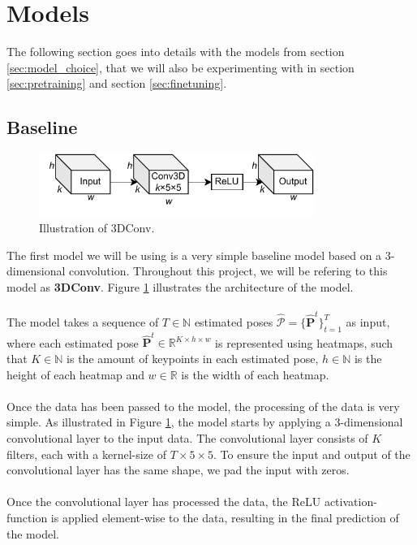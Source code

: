 \documentclass[./main.tex]{subfiles}
\begin{document}
\section{Models}
\label{sec:models}
The following section goes into details with the models from section \ref{sec:model_choice}, that we will also be experimenting with in section \ref{sec:pretraining} and section \ref{sec:finetuning}.

\subsection{Baseline}
\begin{figure}[htbp]
    \centering
    \includegraphics[width=0.8\textwidth]{./entities/baseline.pdf}
    \caption{Illustration of 3DConv.}
    \label{fig:baseline}
\end{figure}

\noindent The first model we will be using is a very simple baseline model based on a 3-dimensional convolution. Throughout this project, we will be refering to this model as \textbf{3DConv}. Figure \ref{fig:baseline} illustrates the architecture of the model.
\\
\\
The model takes a sequence of $T \in \mathbb{N}$ estimated poses $\hat{\mathcal{P}} = \{\hat{\bm{P}}^t\}_{t = 1} ^T$ as input, where each estimated pose $\hat{\bm{P}}^t \in \mathbb{R}^{K \times h \times w}$ is represented using heatmaps, such that $K \in \mathbb{N}$ is the amount of keypoints in each estimated pose, $h \in \mathbb{N}$ is the height of each heatmap and $w \in \mathbb{R}$ is the width of each heatmap.
\\
\\
Once the data has been passed to the model, the processing of the data is very simple. As illustrated in Figure \ref{fig:baseline}, the model starts by applying a 3-dimensional convolutional layer to the input data. The convolutional layer consists of $K$ filters, each with a kernel-size of $T \times 5 \times 5$. To ensure the input and output of the convolutional layer has the same shape, we pad the input with zeros.
\\
\\
Once the convolutional layer has processed the data, the ReLU activation-function is applied element-wise to the data, resulting in the final prediction of the model.
\end{document}
